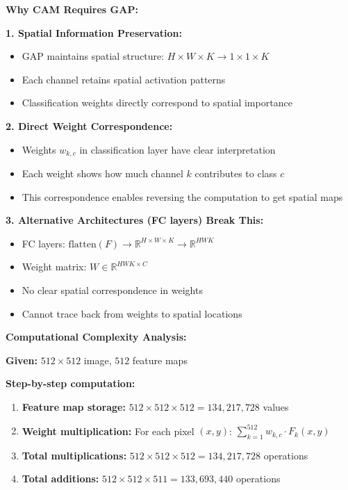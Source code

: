 \documentclass[12pt]{article}
\begin{document}
\begin{enumerate}[(a)]
{    \textbf{Why CAM Requires GAP:}
    
    \textbf{1. Spatial Information Preservation:}
    \begin{itemize}
        \item GAP maintains spatial structure: $H \times W \times K \rightarrow 1 \times 1 \times K$
        \item Each channel retains spatial activation patterns
        \item Classification weights directly correspond to spatial importance
    \end{itemize}
    
    \textbf{2. Direct Weight Correspondence:}
    \begin{itemize}
        \item Weights $w_{k,c}$ in classification layer have clear interpretation
        \item Each weight shows how much channel $k$ contributes to class $c$
        \item This correspondence enables reversing the computation to get spatial maps
    \end{itemize}
    
    \textbf{3. Alternative Architectures (FC layers) Break This:}
    \begin{itemize}
        \item FC layers: $\text{flatten}(F) \rightarrow \mathbb{R}^{H \times W \times K} \rightarrow \mathbb{R}^{HWK}$
        \item Weight matrix: $W \in \mathbb{R}^{HWK \times C}$
        \item No clear spatial correspondence in weights
        \item Cannot trace back from weights to spatial locations
    \end{itemize}
    
    \textbf{Computational Complexity Analysis:}
    
    \textbf{Given:} $512 \times 512$ image, $512$ feature maps
    
    \textbf{Step-by-step computation:}
    \begin{enumerate}
        \item \textbf{Feature map storage:} $512 \times 512 \times 512 = 134,217,728$ values
        \item \textbf{Weight multiplication:} For each pixel $(x,y)$: $\sum_{k=1}^{512} w_{k,c} \cdot F_k(x,y)$
        \item \textbf{Total multiplications:} $512 \times 512 \times 512 = 134,217,728$ operations
        \item \textbf{Total additions:} $512 \times 512 \times 511 = 133,693,440$ operations
    \end{enumerate}
    
}
\end{enumerate}
\end{document}
